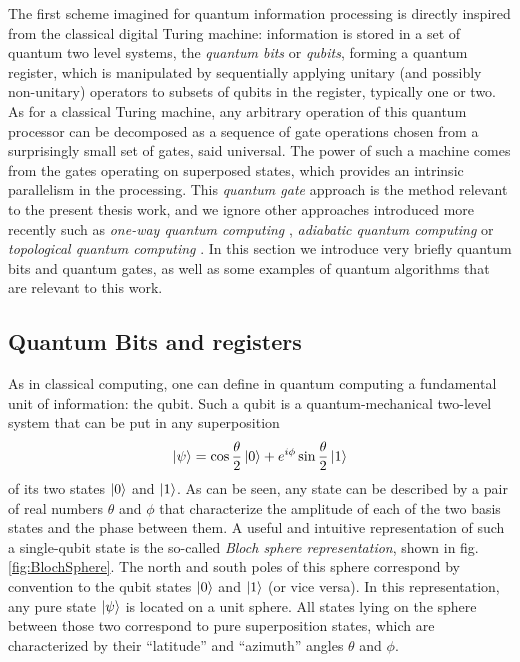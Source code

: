 The first scheme imagined for quantum information processing is directly inspired from the classical digital Turing machine: information is stored in a set of quantum two level systems, the {\it quantum bits} or {\it qubits}, forming a quantum register, which is manipulated by sequentially applying unitary (and possibly non-unitary) operators to subsets of qubits in the register, typically one or two. As for a classical Turing machine, any arbitrary operation of this quantum processor can be decomposed as a sequence of gate operations chosen from a surprisingly small set of gates, said universal. The power of such a machine comes from the gates operating on superposed states, which provides an intrinsic parallelism in the processing.
\smallskip
This {\it quantum gate} approach is the method relevant to the present thesis work, and we ignore other approaches introduced more recently such as {\it one-way quantum computing} \citep{raussendorf_one-way_2001}, {\it adiabatic quantum computing} \citep{farhi_quantum_2000} or {\it topological quantum computing} \citep{kitaev_fault-tolerant_2003}. In this section we introduce very briefly quantum bits and quantum gates, as well as some examples of quantum algorithms that are relevant to this work.


\subsection{Quantum Bits and registers}

As in classical computing, one can define in quantum computing a fundamental unit of information: the qubit. Such a qubit is a quantum-mechanical two-level system that can be put in any superposition
%
\begin{equation}
\left| \psi \right> = \cos{\frac{\theta}{2}}\left| 0 \right>+e^{i\phi}\sin{\frac{\theta}{2}}\left| 1 \right>
\end{equation}
%
of its two states $\left| 0 \right>$ and $\left| 1 \right>$.
As can be seen, any state can be described by a pair of real numbers $\theta$ and $\phi$ that characterize the amplitude of each of the two basis states and the phase between them. A useful and intuitive representation of such a single-qubit state is the so-called {\it Bloch sphere representation}, shown in fig. \ref{fig:BlochSphere}. The north and south poles of this sphere correspond by convention to the qubit states $\left| 0 \right>$ and $\left| 1 \right>$ (or vice versa). In this representation, any pure state $\left| \psi \right>$ is located on a unit sphere. All states lying on the sphere between those two correspond to pure superposition states, which are characterized by their ``latitude'' and ``azimuth'' angles $\theta$ and $\phi$. 

